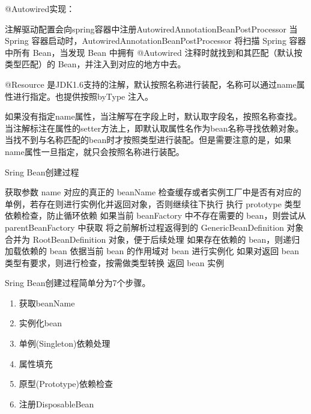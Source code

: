 \documentclass[8pt]{book}
\makeatletter
\numberwithin{dummy}{section}
\theoremstyle{ocrenumbox}
\theoremstyle{blacknumex}
\theoremstyle{blacknumbox}
\theoremstyle{ocrenum}
\renewcommand{\subsection}{\@startsection {subsection}{2}{\z@}
	{-3ex \@plus -0.1ex \@minus -.4ex}
	{0.5ex \@plus.2ex }
	{\normalfont\sffamily\bfseries}}
\makeatother
\begin{document}
@Autowired实现：

注解驱动配置会向spring容器中注册AutowiredAnnotationBeanPostProcessor
当 Spring 容器启动时，AutowiredAnnotationBeanPostProcessor 将扫描 Spring 容器中所有 Bean，当发现 Bean 中拥有 @Autowired 注释时就找到和其匹配（默认按类型匹配）的 Bean，并注入到对应的地方中去。



@Resource 是JDK1.6支持的注解，默认按照名称进行装配，名称可以通过name属性进行指定。也提供按照byType 注入。

如果没有指定name属性，当注解写在字段上时，默认取字段名，按照名称查找。
当注解标注在属性的setter方法上，即默认取属性名作为bean名称寻找依赖对象。
当找不到与名称匹配的bean时才按照类型进行装配。但是需要注意的是，如果name属性一旦指定，就只会按照名称进行装配。


\subsection{Sring Bean创建过程}

获取参数 name 对应的真正的 beanName
检查缓存或者实例工厂中是否有对应的单例，若存在则进行实例化并返回对象，否则继续往下执行
执行 prototype 类型依赖检查，防止循环依赖
如果当前 beanFactory 中不存在需要的 bean，则尝试从 parentBeanFactory 中获取
将之前解析过程返得到的 GenericBeanDefinition 对象合并为 RootBeanDefinition 对象，便于后续处理
如果存在依赖的 bean，则递归加载依赖的 bean
依据当前 bean 的作用域对 bean 进行实例化
如果对返回 bean 类型有要求，则进行检查，按需做类型转换
返回 bean 实例


Sring Bean创建过程简单分为7个步骤。

\begin{enumerate}
\item{获取beanName}
\item{实例化bean}
\item{单例(Singleton)依赖处理}
\item{属性填充}
\item{原型(Prototype)依赖检查}
\item{注册DisposableBean}
\end{enumerate}
\end{document}
